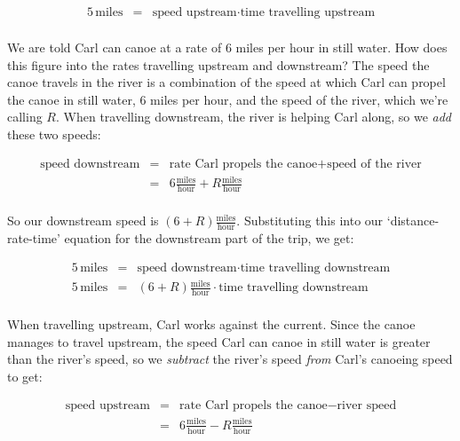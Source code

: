 {\[\begin{array}{rcl}
5 \, \text{miles} & = & \text{speed upstream} \cdot \text{time travelling upstream} \\ \end{array} \]

We are told Carl can canoe at a  rate of $6$ miles per hour in still water.  How does this figure into the rates travelling upstream and downstream?  The speed the canoe travels in the river is a combination of the speed at which Carl can propel the canoe in still water, 6 miles per hour,  and the speed of the river, which we're calling $R$. When travelling downstream, the river is helping Carl along, so we \textit{add} these two speeds: 

\[ \begin{array}{rcl}

\text{speed downstream} & = & \text{rate Carl propels the canoe} + \text{speed of the river} \\

 & = & 6 \frac{\text{miles}}{\text{hour}} + R \frac{\text{miles}}{\text{hour}} \\ \end{array} \]
 
 So our downstream speed is $(6+R) \frac{\text{miles}}{\text{hour}}$.  Substituting this into our `distance-rate-time' equation for the downstream part of the trip, we get:
 
 \[ \begin{array}{rcl}

5 \, \text{miles} & = & \text{speed downstream} \cdot \text{time travelling downstream} \\ 

5 \, \text{miles} & = & (6+R) \frac{\text{miles}}{\text{hour}} \cdot \text{time travelling downstream} \\ 	\end{array} \]

 When travelling upstream, Carl works against the current.  Since the canoe manages to travel upstream,  the speed Carl can canoe in still water is greater than the river's speed, so we \textit{subtract} the river's speed \textit{from} Carl's canoeing speed to get:
 
\drawexampleline

 \[ \begin{array}{rcl}

\text{speed upstream} & = & \text{rate Carl propels the canoe} - \text{river speed} \\

 & = & 6 \frac{\text{miles}}{\text{hour}} - R \frac{\text{miles}}{\text{hour}} \\ \end{array} \]
 
}
